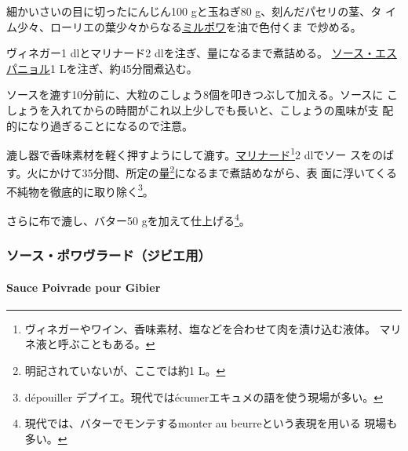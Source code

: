 \begin{recette}

細かいさいの目に切ったにんじん100 gと玉ねぎ80 g、刻んだパセリの茎、タ
イム少々、ローリエの葉少々からなる\protect\hyperlink{mirepoix}{ミルポワ}を油で色付くま
で炒める。

ヴィネガー1 dlとマリナード2 dlを注ぎ、\untiers{}量になるまで煮詰める。
\protect\hyperlink{sauce-espagnole}{ソース・エスパニョル}1
Lを注ぎ、約45分間煮込む。

ソースを漉す10分前に、大粒のこしょう8個を叩きつぶして加える。ソースに
こしょうを入れてからの時間がこれ以上少しでも長いと、こしょうの風味が支
配的になり過ぎることになるので注意。

漉し器で香味素材を軽く押すようにして漉す。\protect\hyperlink{}{マリナード}\footnote{ヴィネガーやワイン、香味素材、塩などを合わせて肉を漬け込む液体。
  マリネ液と呼ぶこともある。}2 dlでソー
スをのばす。火にかけて35分間、所定の量\footnote{明記されていないが、ここでは約1
  L。}になるまで煮詰めながら、表
面に浮いてくる不純物を徹底的に取り除く\footnote{dépouiller
  デプイエ。現代ではécumerエキュメの語を使う現場が多い。}。

さらに布で漉し、バター50 gを加えて仕上げる\footnote{現代では、バターでモンテするmonter
  au beurreという表現を用いる 現場も多い。}。

\maeaki

\hypertarget{ux30bdux30fcux30b9ux30ddux30efux30f4ux30e9ux30fcux30c9ux30b8ux30d3ux30a8ux7528}{%
\subsubsection{ソース・ポワヴラード（ジビエ用）}\label{ux30bdux30fcux30b9ux30ddux30efux30f4ux30e9ux30fcux30c9ux30b8ux30d3ux30a8ux7528}}

\hypertarget{sauce-poivrade-pour-gibier}{%
\paragraph{Sauce Poivrade pour
Gibier}\label{sauce-poivrade-pour-gibier}}



\end{recette}
